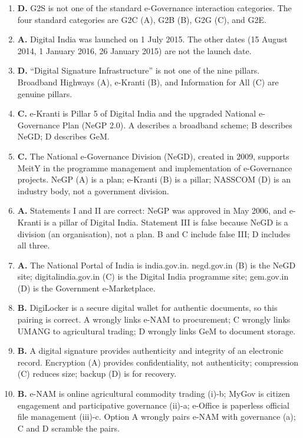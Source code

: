 \documentclass[11pt]{article}
\begin{document}
\begin{enumerate}[label=\textbf{Q\arabic*.}, leftmargin=*]
\item \textbf{D.} G2S is not one of the standard e-Governance interaction
  categories. The four standard categories are G2C (A), G2B (B), G2G (C),
  and G2E.
\item \textbf{A.} Digital India was launched on 1 July 2015. The other dates
  (15 August 2014, 1 January 2016, 26 January 2015) are not the launch date.
\item \textbf{D.} ``Digital Signature Infrastructure'' is not one of the nine
  pillars. Broadband Highways (A), e-Kranti (B), and Information for All
  (C) are genuine pillars.
\item \textbf{C.} e-Kranti is Pillar 5 of Digital India and the upgraded
  National e-Governance Plan (NeGP 2.0). A describes a broadband scheme; B
  describes NeGD; D describes GeM.
\item \textbf{C.} The National e-Governance Division (NeGD), created in 2009,
  supports MeitY in the programme management and implementation of
  e-Governance projects. NeGP (A) is a plan; e-Kranti (B) is a pillar;
  NASSCOM (D) is an industry body, not a government division.
\item \textbf{A.} Statements I and II are correct: NeGP was approved in May
  2006, and e-Kranti is a pillar of Digital India. Statement III is false
  because NeGD is a division (an organisation), not a plan. B and C include
  false III; D includes all three.
\item \textbf{A.} The National Portal of India is india.gov.in. negd.gov.in
  (B) is the NeGD site; digitalindia.gov.in (C) is the Digital India
  programme site; gem.gov.in (D) is the Government e-Marketplace.
\item \textbf{B.} DigiLocker is a secure digital wallet for authentic
  documents, so this pairing is correct. A wrongly links e-NAM to
  procurement; C wrongly links UMANG to agricultural trading; D wrongly
  links GeM to document storage.
\item \textbf{B.} A digital signature provides authenticity and integrity of
  an electronic record. Encryption (A) provides confidentiality, not
  authenticity; compression (C) reduces size; backup (D) is for recovery.
\item \textbf{B.} e-NAM is online agricultural commodity trading (i)-b;
  MyGov is citizen engagement and participative governance (ii)-a; e-Office
  is paperless official file management (iii)-c. Option A wrongly pairs
  e-NAM with governance (a); C and D scramble the pairs.


\end{enumerate}
\end{document}

